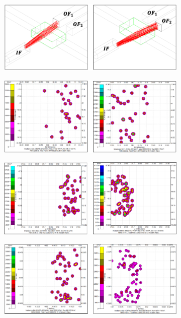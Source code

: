 \documentclass[sn-mathphys]{sn-jnl}
\theoremstyle{thmstyleone}%
\theoremstyle{thmstyletwo}%
\theoremstyle{thmstylethree}%
\begin{document}
\begin{figure}
	\centering
	\begin{subfigure}[b]{0.8\columnwidth}
		\includegraphics[width=\columnwidth]{d3-rays_path.png}
		\caption{}
		\label{fig:d3-rays_path}
	\end{subfigure}
	\centering
	\begin{subfigure}[b]{0.8\columnwidth}
		\includegraphics[width=\textwidth]{d1-radiance_map.png}
		\caption{}
		\label{fig:d1-radiance_map}
	\end{subfigure}
	\centering	
	\begin{subfigure}[b]{0.8\columnwidth}			
		\includegraphics[width=\textwidth]{d2-radiance_map.png}
		\caption{}
		\label{fig:d2-radiance_map}
	\end{subfigure}
	\centering	
	\begin{subfigure}[b]{0.8\columnwidth}			
		\includegraphics[width=\textwidth]{d3-radiance_map.png}

\end{subfigure}
\end{figure}
\end{document}
